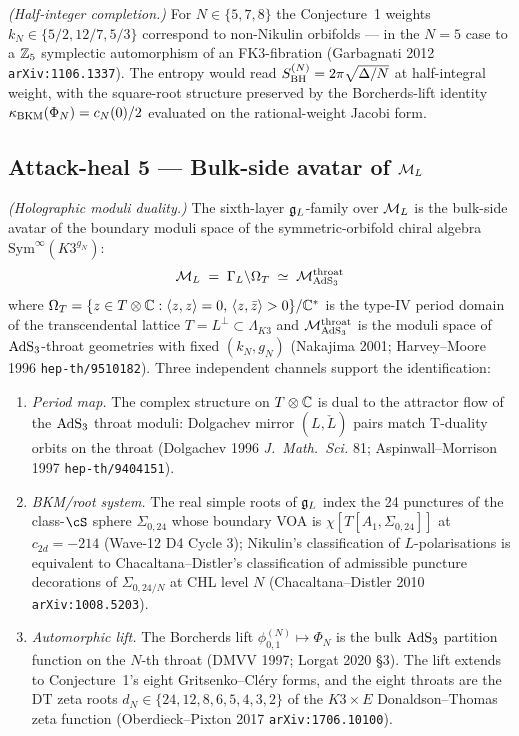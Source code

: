 \ClaimStatusConjectured{} \emph{(Half-integer completion.)} For
$N\in\{5,7,8\}$ the Conjecture~1 weights $k_N\in\{5/2,12/7,5/3\}$
correspond to non-Nikulin orbifolds --- in the $N=5$ case to a
$\mathbb{Z}_5$ symplectic automorphism of an FK3-fibration (Garbagnati 2012
\texttt{arXiv:1106.1337}). The entropy would read
$S_{\mathrm{BH}}^{(N)}=2\pi\sqrt{\Delta/N}$ at half-integral weight, with
the square-root structure preserved by the Borcherds-lift identity
$\kappa_{\mathrm{BKM}}(\Phi_N)=c_N(0)/2$ evaluated on the rational-weight
Jacobi form.

\subsection*{Attack-heal 5 --- Bulk-side avatar of $\mathcal{M}_L$}

\ClaimStatusConjectured{} \emph{(Holographic moduli duality.)} The
sixth-layer $\mathfrak{g}_{L}$-family over $\mathcal{M}_L$ is the bulk-side avatar of the
boundary moduli space of the symmetric-orbifold chiral algebra
$\mathrm{Sym}^\infty(K3^{g_N})$:
\[
  \mathcal{M}_L\;=\;\Gamma_L\backslash\Omega_{T}\;\simeq\;
    \mathcal{M}_{\mathrm{AdS}_3}^{\mathrm{throat}}
\]
where $\Omega_T=\{z\in T\otimes\mathbb{C}:\langle z,z\rangle=0,\,
\langle z,\bar z\rangle>0\}/\mathbb{C}^{*}$ is the type-IV period domain of
the transcendental lattice $T=L^\perp\subset\Lambda_{K3}$ and
$\mathcal{M}_{\mathrm{AdS}_3}^{\mathrm{throat}}$ is the moduli space of
$\mathrm{AdS}_3$-throat geometries with fixed $(k_N,g_N)$ (Nakajima 2001;
Harvey--Moore 1996 \texttt{hep-th/9510182}). Three independent
channels support the identification:
\begin{enumerate}
\item \emph{Period map.} The complex structure on
$T\otimes\mathbb{C}$ is dual to the attractor flow of the $\mathrm{AdS}_3$ throat
moduli: Dolgachev mirror $(L,\check L)$ pairs match T-duality
orbits on the throat (Dolgachev 1996 \emph{J.\ Math.\ Sci.} 81;
Aspinwall--Morrison 1997 \texttt{hep-th/9404151}).
\item \emph{BKM/root system.} The real simple roots of $\mathfrak{g}_{L}$
index the 24 punctures of the class-$\cS$ sphere $\Sigma_{0,24}$
whose boundary VOA is $\chi[T[A_1,\Sigma_{0,24}]]$ at
$c_{2d}=-214$ (Wave-12 D4 Cycle 3); Nikulin's classification of
$L$-polarisations is equivalent to Chacaltana--Distler's
classification of admissible puncture decorations of
$\Sigma_{0,24/N}$ at CHL level $N$ (Chacaltana--Distler 2010
\texttt{arXiv:1008.5203}).
\item \emph{Automorphic lift.} The Borcherds lift
$\phi^{(N)}_{0,1}\mapsto\Phi_N$ is the bulk $\mathrm{AdS}_3$ partition
function on the $N$-th throat (DMVV 1997; Lorgat 2020
\S3). The lift extends to Conjecture~1's eight Gritsenko--Cl\'ery
forms, and the eight throats are the DT zeta roots
$d_N\in\{24,12,8,6,5,4,3,2\}$ of the $K3\times E$
Donaldson--Thomas zeta function (Oberdieck--Pixton 2017
\texttt{arXiv:1706.10100}).
\end{enumerate}

